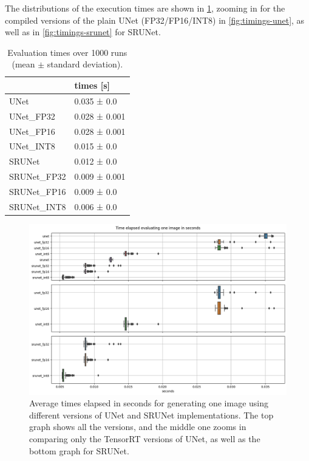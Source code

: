 The distributions of the execution times are shown in \cref{fig:timings-all}, zooming in for the compiled versions of the plain UNet (FP32/FP16/INT8) in \cref{fig:timings-unet}, as well as in \cref{fig:timings-srunet} for SRUNet.

\begin{table}[t]
\begin{tabular}{ll}
\toprule
{} &      times [s] \\
\midrule
UNet        &    0.035 ± 0.0 \\
UNet\_FP32   &  0.028 ± 0.001 \\
UNet\_FP16   &  0.028 ± 0.001 \\
UNet\_INT8   &    0.015 ± 0.0 \\
SRUNet      &    0.012 ± 0.0 \\
SRUNet\_FP32 &  0.009 ± 0.001 \\
SRUNet\_FP16 &    0.009 ± 0.0 \\
SRUNet\_INT8 &    0.006 ± 0.0 \\
\bottomrule
\end{tabular}
\caption{Evaluation times over 1000 runs (mean $\pm$ standard deviation).}
\label{tab:timings}
\end{table}

\begin{figure}[ht]
\includegraphics[width=1.0\textwidth]{static/2023_03_02_boxplots_timings_all.png}
\caption{Average times elapsed in seconds for generating one image using different versions of UNet and SRUNet implementations. The top graph shows all the versions, and the middle one zooms in comparing only the 
TensorRT versions of UNet, as well as the bottom graph for SRUNet.}
\label{fig:timings-all}
\end{figure}

